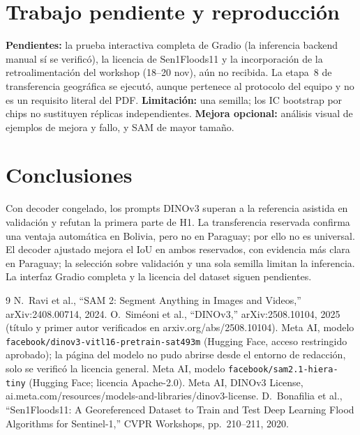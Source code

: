 \documentclass[conference]{IEEEtran}
\begin{document}
\section{Trabajo pendiente y reproducci\'on}
\textbf{Pendientes:} la prueba interactiva completa de Gradio (la inferencia backend manual s\'i se verific\'o), la licencia de Sen1Floods11 y la incorporaci\'on de la retroalimentaci\'on del workshop (18--20 nov), a\'un no recibida. La etapa~8 de transferencia geogr\'afica se ejecut\'o, aunque pertenece al protocolo del equipo y no es un requisito literal del PDF. \textbf{Limitaci\'on:} una semilla; los IC bootstrap por chips no sustituyen r\'eplicas independientes. \textbf{Mejora opcional:} an\'alisis visual de ejemplos de mejora y fallo, y SAM de mayor tama\~no.

\section{Conclusiones}
Con decoder congelado, los prompts DINOv3 superan a la referencia asistida en validaci\'on y refutan la primera parte de H1. La transferencia reservada confirma una ventaja autom\'atica en Bolivia, pero no en Paraguay; por ello no es universal. El decoder ajustado mejora el IoU en ambos reservados, con evidencia m\'as clara en Paraguay; la selecci\'on sobre validaci\'on y una sola semilla limitan la inferencia. La interfaz Gradio completa y la licencia del dataset siguen pendientes.

\begin{thebibliography}{9}\footnotesize
{} N.~Ravi et al., ``SAM 2: Segment Anything in Images and Videos,'' arXiv:2408.00714, 2024.
 O.~Sim\'eoni et al., ``DINOv3,'' arXiv:2508.10104, 2025 (t\'itulo y primer autor verificados en arxiv.org/abs/2508.10104).
 Meta AI, modelo \texttt{facebook/}\allowbreak\texttt{dinov3-vitl16-}\allowbreak\texttt{pretrain-sat493m} (Hugging Face, acceso restringido aprobado); la p\'agina del modelo no pudo abrirse desde el entorno de redacci\'on, solo se verific\'o la licencia general.
 Meta AI, modelo \texttt{facebook/sam2.1-hiera-tiny} (Hugging Face; licencia Apache-2.0).
 Meta AI, DINOv3 License, ai.meta.com/resources/models-and-libraries/dinov3-license.
 D.~Bonafilia et al., ``Sen1Floods11: A Georeferenced Dataset to Train and Test Deep Learning Flood Algorithms for Sentinel-1,'' CVPR Workshops, pp.~210--211, 2020.
\end{thebibliography}
\end{document}
